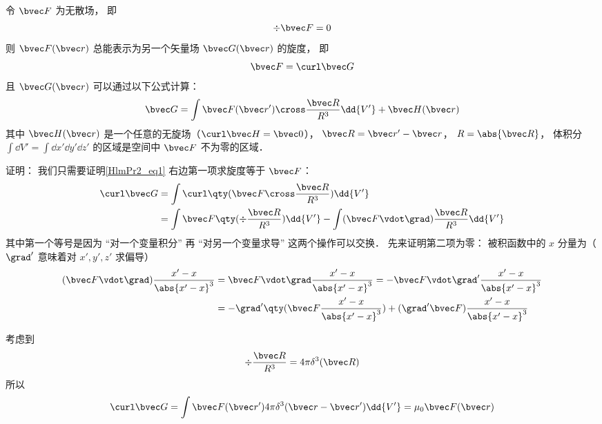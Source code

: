 
\begin{theorem}{}
令 $\bvec F$ 为无散场， 即
\begin{equation}
\div \bvec F = 0
\end{equation}
则 $\bvec F(\bvec r)$ 总能表示为另一个矢量场 $\bvec G(\bvec r)$ 的旋度， 即
\begin{equation}
\bvec F = \curl \bvec G
\end{equation}
且 $\bvec G(\bvec r)$ 可以通过以下公式计算：
\begin{equation}\label{HlmPr2_eq1}
\bvec G = \int \bvec F(\bvec r') \cross \frac{\bvec R}{R^3} \dd{V'} + \bvec H(\bvec r)
\end{equation}
其中 $\bvec H(\bvec r)$ 是一个任意的无旋场（$\curl \bvec H = \bvec 0$）， $\bvec R = \bvec r' - \bvec r$， $R = \abs{\bvec R}$， 体积分 $\int\dd{V'} = \int\dd{x'}\dd{y'}\dd{z'}$ 的区域是空间中 $\bvec F$ 不为零的区域．
\end{theorem}

证明： 我们只需要证明\autoref{HlmPr2_eq1} 右边第一项求旋度等于 $\bvec F$：
\begin{equation}
\begin{aligned}
\curl \bvec G &= \int \curl \qty(\bvec F \cross \frac{\bvec R}{R^3}) \dd{V'}\\
&= \int\bvec F \qty(\div \frac{\bvec R}{R^3}) \dd{V'} -  \int(\bvec F \vdot \grad) \frac{\bvec R}{R^3} \dd{V'}
\end{aligned}
\end{equation}
其中第一个等号是因为 “对一个变量积分” 再 “对另一个变量求导” 这两个操作可以交换． %
先来证明第二项为零： 被积函数中的 $x$ 分量为（$\grad'$ 意味着对 $x', y', z'$ 求偏导）
\begin{equation}
\begin{aligned}
(\bvec F \vdot \grad) \frac{x' - x}{\abs{x'-x}^3} &= \bvec F \vdot \grad \frac{x' - x}{\abs{x'-x}^3} = -\bvec F \vdot \grad' \frac{x' - x}{\abs{x'-x}^3}\\
&= - \grad'\qty(\bvec F \frac{x' - x}{\abs{x'-x}^3}) + (\grad'\bvec F) \frac{x' - x}{\abs{x'-x}^3}
\end{aligned}
\end{equation}


考虑到
\begin{equation}
\div \frac{\bvec R}{R^3} = 4\pi \delta^3(\bvec R)
\end{equation}
所以
\begin{equation}
\curl \bvec G = \int \bvec F(\bvec r') 4\pi \delta^3(\bvec r - \bvec r') \dd{V'} = \mu_0 \bvec F(\bvec r)
\end{equation}
